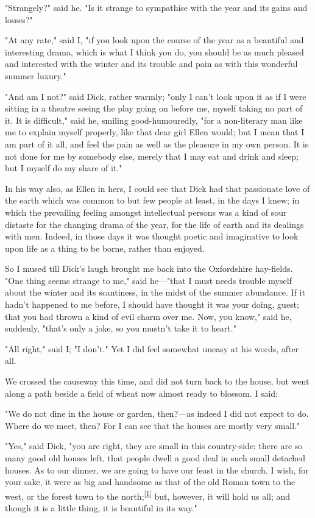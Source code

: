 "Strangely?" said he. "Is it strange to sympathise with the year and its
gains and losses?"

"At any rate," said I, "if you look upon the course of the year as a
beautiful and interesting drama, which is what I think you do, you
should be as much pleased and interested with the winter and its trouble
and pain as with this wonderful summer luxury."

"And am I not?" said Dick, rather warmly; "only I can't look upon it as
if I were sitting in a theatre seeing the play going on before me,
myself taking no part of it. It is difficult," said he, smiling
good-humouredly, "for a non-literary man like me to explain myself
properly, like that dear girl Ellen would; but I mean that I am part of
it all, and feel the pain as well as the pleasure in my own person. It
is not done for me by somebody else, merely that I may eat and drink and
sleep; but I myself do my share of it."

In his way also, as Ellen in hers, I could see that Dick had that
passionate love of the earth which was common to but few people at
least, in the days I knew; in which the prevailing feeling amongst
intellectual persons was a kind of sour distaste for the changing drama
of the year, for the life of earth and its dealings with men. Indeed, in
those days it was thought poetic and imaginative to look upon life as a
thing to be borne, rather than enjoyed.

So I mused till Dick's laugh brought me back into the Oxfordshire
hay-fields. "One thing seems strange to me," said he---"that I must
needs trouble myself about the winter and its scantiness, in the midst
of the summer abundance. If it hadn't happened to me before, I should
have thought it was your doing, guest; that you had thrown a kind of
evil charm over me. Now, you know," said he, suddenly, "that's only a
joke, so you mustn't take it to heart."

"All right," said I; "I don't." Yet I did feel somewhat uneasy at his
words, after all.

We crossed the causeway this time, and did not turn back to the house,
but went along a path beside a field of wheat now almost ready to
blossom. I said:

"We do not dine in the house or garden, then?---as indeed I did not
expect to do. Where do we meet, then? For I can see that the houses are
mostly very small."

"Yes," said Dick, "you are right, they are small in this country-side:
there are so many good old houses left, that people dwell a good deal in
such small detached houses. As to our dinner, we are going to have our
feast in the church. I wish, for your sake, it were as big and handsome
as that of the old Roman town to the west, or the forest town to the
north;\textsuperscript{\protect\hyperlink{cite_note-1}{{[}1{]}}} but,
however, it will hold us all; and though it is a little thing, it is
beautiful in its way."

